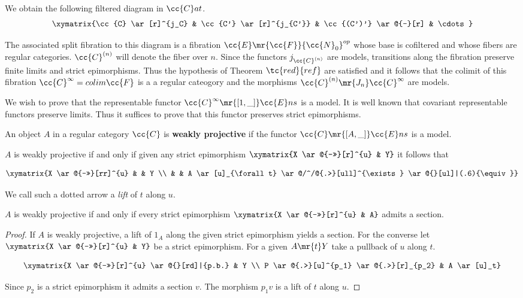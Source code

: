 
\begin{observation}
We obtain the following filtered diagram in $\cc{C}at$.
\[
\xymatrix{\cc{C} \ar[r]^{j_C} & \cc{C'} \ar[r]^{j_{C'}} & \cc{(C')'} \ar@{-}[r] & \cdots }
\]

The associated split fibration to this diagram is a fibration $\cc{E} \mr{\cc{F}} {\cc{N}_0}^{op}$ whose base is cofiltered and whose fibers are regular categories. $\cc{C}^{(n)}$ will denote the fiber over $n$. Since the functors $j_{\cc{C}^{(n)}}$ are models, transitions along the fibration preserve finite limits and strict epimorphisms. Thus the hypothesis of Theorem $\tc{red}{ref}$ are satisfied and it follows that the colimit of this fibration $\cc{C}^\infty=colim\cc{F}$ is a a regular cateogory and the morphisms $\cc{C}^{(n)} \mr{J_n} \cc{C}^\infty$ are models.
\end{observation}

We wish to prove that the representable functor $\cc{C}^\infty \mr{[1,\_]} \cc{E}ns$ is a model. It is well known that covariant representable functors preserve limits. Thus it suffices to prove that this functor preserves strict epimorphisms. 

\begin{definition}
An object $A$ in a regular category $\cc{C}$ is \textbf{weakly projective} if the functor $\cc{C} \mr{[A,\_]} \cc{E}ns$ is a model.
\end{definition}

\begin{remark}
$A$ is weakly projective if and only if given any strict epimorphism $\xymatrix{X \ar@{->>}[r]^{u} &  Y}$  it follows that

\[
\xymatrix{X \ar@{->>}[rr]^{u} & & Y \\ & & A \ar[u]_{\forall t} \ar@/^/@{.>}[ull]^{\exists} \ar@{}[ul]|(.6){\equiv}}
\]

We call such a dotted arrow a \textit{lift} of $t$ along $u$.
\end{remark}


\begin{lemma}
$A$ is weakly projective if and only if every strict epimorphism $\xymatrix{X \ar@{->>}[r]^{u} & A}$ admits a section.
\end{lemma}

\begin{proof}
If $A$ is weakly projective, a lift of $1_A$ along the given strict epimorphism yields a section. For the converse let $\xymatrix{X \ar@{->>}[r]^{u} & Y}$ be a strict epimorphism. For a given $A \mr{t} Y$ take a pullback of $u$ along $t$.

\[
\xymatrix{X \ar@{->>}[r]^{u} \ar@{}[rd]|{p.b.} & Y \\ P \ar@{.>}[u]^{p_1} \ar@{.>}[r]_{p_2} & A \ar[u]_t}
\]

Since $p_2$ is a strict epimorphism it admits a section $v$. The morphism $p_1v$ is a lift of $t$ along $u$.
\end{proof} 

